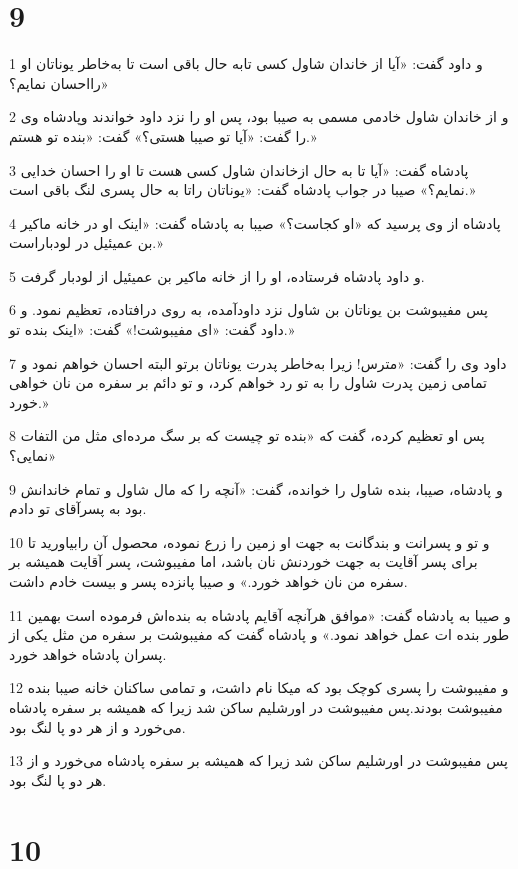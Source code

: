 \chapter{9}

\par 1 و داود گفت: «آیا از خاندان شاول کسی تابه حال باقی است تا به‌خاطر یوناتان او رااحسان نمایم؟»
\par 2 و از خاندان شاول خادمی مسمی به صیبا بود، پس او را نزد داود خواندند وپادشاه وی را گفت: «آیا تو صیبا هستی؟» گفت: «بنده تو هستم.»
\par 3 پادشاه گفت: «آیا تا به حال ازخاندان شاول کسی هست تا او را احسان خدایی نمایم؟» صیبا در جواب پادشاه گفت: «یوناتان راتا به حال پسری لنگ باقی است.»
\par 4 پادشاه از وی پرسید که «او کجاست؟» صیبا به پادشاه گفت: «اینک او در خانه ماکیر بن عمیئیل در لودباراست.»
\par 5 و داود پادشاه فرستاده، او را از خانه ماکیر بن عمیئیل از لودبار گرفت.
\par 6 پس مفیبوشت بن یوناتان بن شاول نزد داودآمده، به روی در‌افتاده، تعظیم نمود. و داود گفت: «ای مفیبوشت!» گفت: «اینک بنده تو.»
\par 7 داود وی را گفت: «مترس! زیرا به‌خاطر پدرت یوناتان برتو البته احسان خواهم نمود و تمامی زمین پدرت شاول را به تو رد خواهم کرد، و تو دائم بر سفره من نان خواهی خورد.»
\par 8 پس او تعظیم کرده، گفت که «بنده تو چیست که بر سگ مرده‌ای مثل من التفات نمایی؟»
\par 9 و پادشاه، صیبا، بنده شاول را خوانده، گفت: «آنچه را که مال شاول و تمام خاندانش بود به پسرآقای تو دادم.
\par 10 و تو و پسرانت و بندگانت به جهت او زمین را زرع نموده، محصول آن رابیاورید تا برای پسر آقایت به جهت خوردنش نان باشد، اما مفیبوشت، پسر آقایت همیشه بر سفره من نان خواهد خورد.» و صیبا پانزده پسر و بیست خادم داشت.
\par 11 و صیبا به پادشاه گفت: «موافق هر‌آنچه آقایم پادشاه به بنده‌اش فرموده است بهمین طور بنده ات عمل خواهد نمود.» و پادشاه گفت که مفیبوشت بر سفره من مثل یکی از پسران پادشاه خواهد خورد.
\par 12 و مفیبوشت را پسری کوچک بود که میکا نام داشت، و تمامی ساکنان خانه صیبا بنده مفیبوشت بودند.پس مفیبوشت در اورشلیم ساکن شد زیرا که همیشه بر سفره پادشاه می‌خورد و از هر دو پا لنگ بود.
\par 13 پس مفیبوشت در اورشلیم ساکن شد زیرا که همیشه بر سفره پادشاه می‌خورد و از هر دو پا لنگ بود.
 
\chapter{10}

